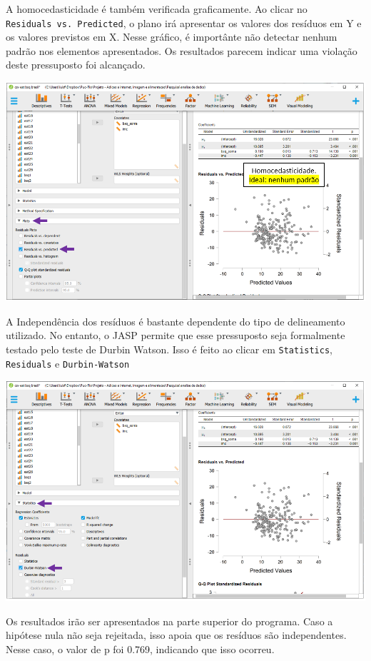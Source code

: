 \documentclass[
]{book}
\begin{document}
A homocedasticidade é também verificada graficamente. Ao clicar no
\texttt{Residuals\ vs.\ Predicted}, o plano irá apresentar os valores
dos resíduos em Y e os valores previstos em X. Nesse gráfico, é
importânte não detectar nenhum padrão nos elementos apresentados. Os
resultados parecem indicar uma violação deste pressuposto foi alcançado.

\includegraphics{./img/cap_reg_multipla_homocedasticidade.png}

A Independência dos resíduos é bastante dependente do tipo de
delineamento utilizado. No entanto, o JASP permite que esse pressuposto
seja formalmente testado pelo teste de Durbin Watson. Isso é feito ao
clicar em \texttt{Statistics}, \texttt{Residuals} e
\texttt{Durbin-Watson}

\includegraphics{./img/cap_reg_multipla_ind_residuos.png}

Os resultados irão ser apresentados na parte superior do programa. Caso
a hipótese nula não seja rejeitada, isso apoia que os resíduos são
independentes. Nesse caso, o valor de p foi 0.769, indicando que isso
ocorreu.
\end{document}
